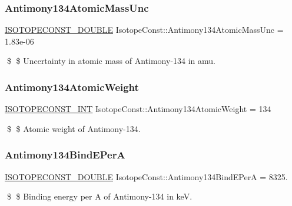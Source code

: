 \subsubsection{\texorpdfstring{Antimony134\+Atomic\+Mass\+Unc}{Antimony134AtomicMassUnc}}
{\footnotesize\ttfamily \mbox{\hyperlink{group___isotope_const-_macros_ga8f45a7272ce02c0b4c65c44636ed719a}{I\+S\+O\+T\+O\+P\+E\+C\+O\+N\+S\+T\+\_\+\+D\+O\+U\+B\+LE}} Isotope\+Const\+::\+Antimony134\+Atomic\+Mass\+Unc = 1.\+83e-\/06}

\$ \$ Uncertainty in atomic mass of Antimony-\/134 in amu. \mbox{\label{group___isotope_const-_antimony-_sb134_ga4d8d1c7bb08da642f96e2723fc1b78b9}} 
\subsubsection{\texorpdfstring{Antimony134\+Atomic\+Weight}{Antimony134AtomicWeight}}
{\footnotesize\ttfamily \mbox{\hyperlink{group___isotope_const-_macros_ga5f18360b3e99483a35c32d789e62621c}{I\+S\+O\+T\+O\+P\+E\+C\+O\+N\+S\+T\+\_\+\+I\+NT}} Isotope\+Const\+::\+Antimony134\+Atomic\+Weight = 134}

\$ \$ Atomic weight of Antimony-\/134. \mbox{\label{group___isotope_const-_antimony-_sb134_ga69a59da4c14e00942bdfa6a71e2208ee}} 
\subsubsection{\texorpdfstring{Antimony134\+Bind\+E\+PerA}{Antimony134BindEPerA}}
{\footnotesize\ttfamily \mbox{\hyperlink{group___isotope_const-_macros_ga8f45a7272ce02c0b4c65c44636ed719a}{I\+S\+O\+T\+O\+P\+E\+C\+O\+N\+S\+T\+\_\+\+D\+O\+U\+B\+LE}} Isotope\+Const\+::\+Antimony134\+Bind\+E\+PerA = 8325.}

\$ \$ Binding energy per A of Antimony-\/134 in keV. \mbox{\label{group___isotope_const-_antimony-_sb134_ga63219a933487e389c5afda81932ea6a5}} 
